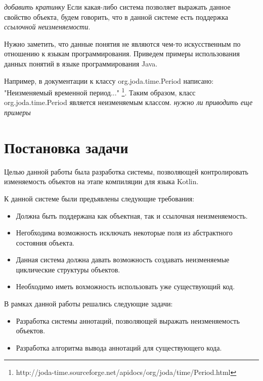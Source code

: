 \textit{добавить кратинку}
Если какая-либо система позволяет выражать данное свойство объекта, будем говорить, что в данной системе есть поддержка \textit{ссылочной неизменяемости}. 

Нужно заметить, что данные понятия не являются чем-то искусственным по отношению к языкам программирования. Приведем примеры использования данных понятий в языке программирования Java.

Например, в документации к классу org.joda.time.Period написано: "Неизменяемый временной период..." \footnote{http://joda-time.sourceforge.net/apidocs/org/joda/time/Period.html}. Таким образом, класс org.joda.time.Period является неизменяемым классом. 
\textit{нужно ли приводить еще примеры}  



\section{Постановка задачи}

Целью данной работы была разработка системы, позволяющей контролировать изменяемость объектов на этапе компиляции для языка Kotlin. 

К данной системе были предъявлены следующие требования:

\begin{itemize}
	\item Должна быть поддержана как объектная, так и ссылочная неизменяемость.
	
	\item Негобходима возможность исключать некоторые поля из абстрактного состояния объекта. 
	
	\item Данная система должна давать возможность создавать неизменяемые циклические структуры объектов.
	
	\item Необходимо иметь вохможность использовать уже существующий код.
\end{itemize}

В рамках данной работы решались следующие задачи:

\begin{itemize}

	\item Разработка системы аннотаций, позволяющей выражать неизменяемость объектов.
	
	\item Разработка алгоритма вывода аннотаций для существующего кода.

\end{itemize}



